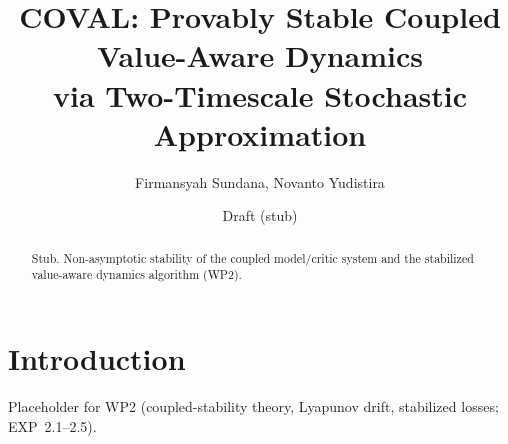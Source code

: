 \documentclass[11pt]{article}
\title{COVAL: Provably Stable Coupled Value-Aware Dynamics\\
  \large via Two-Timescale Stochastic Approximation}
\author{Firmansyah Sundana, Novanto Yudistira}
\date{Draft (stub)}
\begin{document}
\maketitle

\begin{abstract}
Stub. Non-asymptotic stability of the coupled model/critic system and the stabilized
value-aware dynamics algorithm (WP2).
\end{abstract}

\section{Introduction}
Placeholder for WP2 (coupled-stability theory, Lyapunov drift, stabilized losses;
EXP~2.1--2.5).



\end{document}
